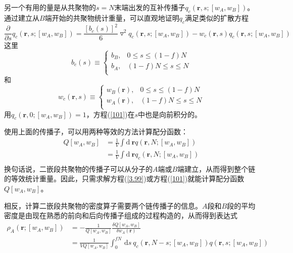 另一个有用的量是从共聚物的$s=N$末端出发的互补传播子$q_c(\mathbf{r},s;[w_A,w_B])$。通过建立从$B$端开始的共聚物统计重量，可以直观地证明$q_c$满足类似的扩散方程
\begin{equation}
\frac{\partial}{\partial s}q_c(\mathbf{r},s;[w_A,w_B])=\frac{[b_c(s)]^2}{6}\triangledown ^2q_c(\mathbf{r},s;[w_A,w_B])-w_c(\mathbf{r},s)q_c(\mathbf{r},s;[w_A,w_B]) \label{101}
\end{equation}
这里
\begin{equation}
b_c (s)\equiv
\begin{cases}
b_B, & 0\leq s \leq (1-f)N \\
b_A, & (1-f)N \leq s \leq N\\
\end{cases}
\end{equation}
和
\begin{equation}
w_c (\mathbf{r},s)\equiv
\begin{cases}
w_B(\mathbf{r}), & 0\leq s \leq (1-f)N \\
w_A(\mathbf{r}), & (1-f)N \leq s \leq N\\
\end{cases}
\end{equation}
用$q_c(\mathbf{r},0;[w_A,w_B])=1$，方程(\ref{101})在$s$中也是向前积分的。		

使用上面的传播子，可以用两种等效的方法计算配分函数：
\begin{equation}
\begin{aligned}
Q[w_A,w_B] & = \frac{1}{V}\int \mathrm{d}~\mathbf{r}q(\mathbf{r},N;[w_A,w_B]) \\
&=\frac{1}{V}\int \mathrm{d}~\mathbf{r}q_c(\mathbf{r},N;[w_A,w_B]) \\
\end{aligned}	
\end{equation}
换句话说，二嵌段共聚物的传播子可以从分子的$A$端或$B$端建立，从而得到整个链的等效统计重量。因此，只需求解方程(\ref{3.99})或方程(\ref{101})就能计算配分函数$Q[w_A,w_B]$。

相反，计算二嵌段共聚物的密度算子需要两个链传播子的信息。$A$段和$B$段的平均密度是由现在熟悉的前向和后向传播子组成的过程构造的，从而得到表达式
\begin{equation}
\begin{aligned}
\rho _A(\mathbf{r};[w_A,w_B]) & =-\frac{1}{Q[w_A,w_B]}	\frac{\delta Q[w_A,w_B]}{\delta w_A(\mathbf{r})} \\
& =\frac{1}{VQ[w_A,w_B]} \int _{0}^{fN}\,\mathrm{d}s~q_c(\mathbf{r},N-s;[w_A,w_B])q(\mathbf{r},s;[w_A,w_B]) \\
\end{aligned}	
\end{equation}

